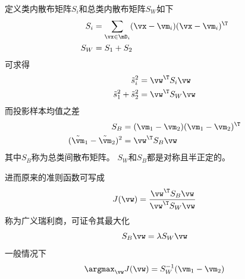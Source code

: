 定义类内散布矩阵$S_i$和总类内散布矩阵$S_W$如下
\[\begin{aligned}
S_i &= \sum_{\vx\in\mD_i}(\vx-\vm_i)(\vx-\vm_i)^\T\\
S_W &= S_1+S_2
\end{aligned}\]
可求得
\[\begin{aligned}
\tilde{s}_i^2 &= \vw^\T S_i\vw\\
\tilde{s}_1^2+\tilde{s}_2^2 &= \vw^\T S_W\vw\\
\end{aligned}\]
而投影样本均值之差
\[\begin{aligned}
S_B &= (\vm_1-\vm_2)(\vm_1-\vm_2)^\T\\
(\tilde{\vm}_1-\tilde{\vm}_2)^2 &= \vw^\T S_B\vw
\end{aligned}\]
其中$S_B$称为总类间散布矩阵。
$S_W$和$S_B$都是对称且半正定的。

进而原来的准则函数可写成
\[J(\vw)=\frac{\vw^\T S_B\vw}{\vw^\T S_W\vw}\]
称为广义瑞利商，可证令其最大化
\[S_B\vw=\lambda S_W\vw\]
一般情况下
\[\argmax_{\vw}J(\vw)=S_W^{-1}(\vm_1-\vm_2)\]
